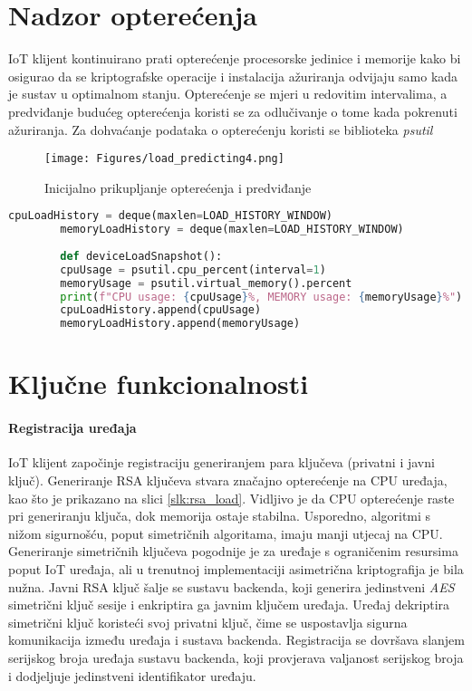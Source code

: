 \documentclass[zavrsnirad]{fer}
\begin{document}
	
	\section{Nadzor opterećenja}
	IoT klijent kontinuirano prati opterećenje procesorske jedinice i memorije kako bi osigurao da se kriptografske operacije i instalacija ažuriranja odvijaju samo kada je sustav u optimalnom stanju. Opterećenje se mjeri u redovitim intervalima, a predviđanje budućeg opterećenja koristi se za odlučivanje o tome kada pokrenuti ažuriranja. Za dohvaćanje podataka o opterećenju koristi se biblioteka \textit{psutil} \cite{psutil}
	
	\begin{figure}[H]
		\centering
		\texttt{[image: Figures/load\_predicting4.png]} 
		\caption{Inicijalno prikupljanje opterećenja i predviđanje}
		\label{slk:device_snapshot}
	\end{figure}
	
	\begin{lstlisting}[language=Python, caption=Nadzor opterećenja]
		cpuLoadHistory = deque(maxlen=LOAD_HISTORY_WINDOW)
		memoryLoadHistory = deque(maxlen=LOAD_HISTORY_WINDOW)
		
		def deviceLoadSnapshot():
		cpuUsage = psutil.cpu_percent(interval=1)
		memoryUsage = psutil.virtual_memory().percent
		print(f"CPU usage: {cpuUsage}%, MEMORY usage: {memoryUsage}%")
		cpuLoadHistory.append(cpuUsage)
		memoryLoadHistory.append(memoryUsage)
	\end{lstlisting}
	
	
	
	\section{Ključne funkcionalnosti}
	
	\paragraph{Registracija uređaja} IoT klijent započinje registraciju generiranjem para ključeva (privatni i javni ključ). Generiranje RSA ključeva stvara značajno opterećenje na CPU uređaja, kao što je prikazano na slici \ref{slk:rsa_load}. Vidljivo je da CPU opterećenje raste pri generiranju ključa, dok memorija ostaje stabilna. Usporedno, algoritmi s nižom sigurnošću, poput simetričnih algoritama, imaju manji utjecaj na CPU. Generiranje simetričnih ključeva pogodnije je za uređaje s ograničenim resursima poput IoT uređaja, ali u trenutnoj implementaciji asimetrična kriptografija je bila nužna. Javni RSA ključ šalje se sustavu backenda, koji generira jedinstveni \textit{AES} simetrični ključ sesije i enkriptira ga javnim ključem uređaja. Uređaj dekriptira simetrični ključ koristeći svoj privatni ključ, čime se uspostavlja sigurna komunikacija između uređaja i sustava backenda. Registracija se dovršava slanjem serijskog broja uređaja sustavu backenda, koji provjerava valjanost serijskog broja i dodjeljuje jedinstveni identifikator uređaju.
	
\end{document}
